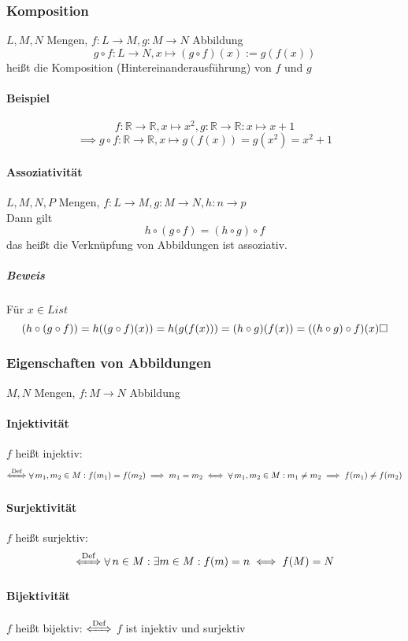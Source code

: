 \documentclass[a4paper]{scrartcl}
\DeclareMathOperator{\Forall}{\forall}
\theoremstyle{definition}
\theoremstyle{plain}
\theoremstyle{plain}
\theoremstyle{remark}
\theoremstyle{remark}
\theoremstyle{remark}
\theoremstyle{remark}
\theoremstyle{remark}
\begin{document}
\subsubsection{Komposition}
\label{sec-2-6-6}
$L,M,N$ Mengen, $f:L\to M,g:M\to N$ Abbildung \\
        \[g\circ f: L\to N, x\mapsto(g\circ f)(x):=g(f(x))\]
heißt die Komposition (Hintereinanderausführung) von $f$ und $g$
\paragraph{Beispiel}
\label{sec-2-6-6-1}
\[f:\mathbb{R}\to\mathbb{R},x\mapsto x^2, g:\mathbb{R}\to\mathbb{R}:x\mapsto x + 1\]
\[\implies g\circ f:\mathbb{R}\to\mathbb{R},x\mapsto g(f(x)) = g(x^2) = x^2 + 1\]
\paragraph{Assoziativität}
\label{sec-2-6-6-2}
$L,M,N,P$ Mengen, $f:L\to M, g:M\to N,h:n\to p$ \\
         Dann gilt
\[h\circ (g\circ f) = (h\circ g)\circ f\]
das heißt die Verknüpfung von Abbildungen ist assoziativ.
\subparagraph{Beweis}
\label{sec-2-6-6-2-1}
Für $x\in L ist$ \\
          \[(h\circ (g\circ f)) = h((g\circ f)(x)) = h(g(f(x))) = (h\circ g)(f(x)) = ((h\circ g)\circ f)(x)\hfill\square\]
\subsubsection{Eigenschaften von Abbildungen}
\label{sec-2-6-7}
$M,N$ Mengen, $f:M\to N$ Abbildung
\paragraph{Injektivität}
\label{sec-2-6-7-1}
$f$ heißt injektiv: \[\xLeftrightarrow{\text{Def}} \Forall m_1,m_2\in M: f(m_1) = f(m_2) \implies m_1 = m_2 \iff \Forall m_1,m_2\in M: m_1\neq m_2 \implies f(m_1)\neq f(m_2)\]
\paragraph{Surjektivität}
\label{sec-2-6-7-2}
$f$ heißt surjektiv:
\[\xLeftrightarrow{\text{Def}} \Forall n\in M :\exists m\in M: f(m) = n \iff f(M) = N\]
\paragraph{Bijektivität}
\label{sec-2-6-7-3}
$f$ heißt bijektiv: $\xLeftrightarrow{\text{Def}}$ $f$ ist injektiv und surjektiv
\end{document}
